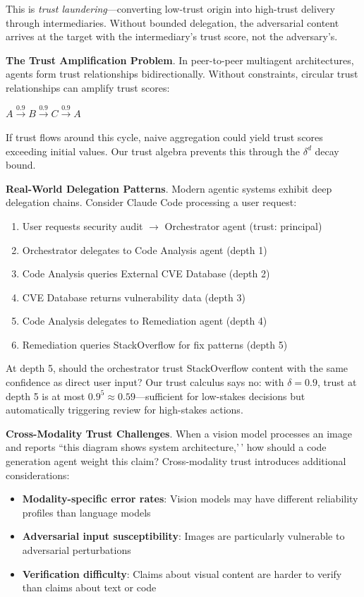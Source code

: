 \documentclass[
]{article}
\begin{document}
This is \textit{trust laundering}---converting low-trust origin into
high-trust delivery through intermediaries. Without bounded delegation,
the adversarial content arrives at the target with the intermediary's
trust score, not the adversary's.

\textbf{The Trust Amplification Problem}. In peer-to-peer multiagent
architectures, agents form trust relationships bidirectionally. Without
constraints, circular trust relationships can amplify trust scores:

\begin{center}
$A \xrightarrow{0.9} B \xrightarrow{0.9} C \xrightarrow{0.9} A$
\end{center}

If trust flows around this cycle, naive aggregation could yield trust
scores exceeding initial values. Our trust algebra prevents this through
the \(\delta^d\) decay bound.

\textbf{Real-World Delegation Patterns}. Modern agentic systems exhibit
deep delegation chains. Consider Claude Code processing a user request:

\begin{enumerate}
\item User requests security audit $\rightarrow$ Orchestrator agent (trust: principal)
\item Orchestrator delegates to Code Analysis agent (depth 1)
\item Code Analysis queries External CVE Database (depth 2)
\item CVE Database returns vulnerability data (depth 3)
\item Code Analysis delegates to Remediation agent (depth 4)
\item Remediation queries StackOverflow for fix patterns (depth 5)
\end{enumerate}

At depth 5, should the orchestrator trust StackOverflow content with the
same confidence as direct user input? Our trust calculus says no: with
\(\delta = 0.9\), trust at depth 5 is at most
\(0.9^5 \approx 0.59\)---sufficient for low-stakes decisions but
automatically triggering review for high-stakes actions.

\textbf{Cross-Modality Trust Challenges}. When a vision model processes
an image and reports ``this diagram shows system architecture,'\,' how
should a code generation agent weight this claim? Cross-modality trust
introduces additional considerations:

\begin{itemize}
\item \textbf{Modality-specific error rates}: Vision models may have different reliability profiles than language models
\item \textbf{Adversarial input susceptibility}: Images are particularly vulnerable to adversarial perturbations
\item \textbf{Verification difficulty}: Claims about visual content are harder to verify than claims about text or code
\end{itemize}
\end{document}
